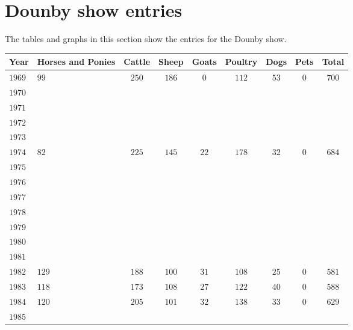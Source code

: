 \section*{Dounby show entries}
The tables and graphs in this section show the entries for the Dounby show.

\begin{longtable}{|l|p{1.1cm}ccccccc|}
\hline
    \textbf{Year} &
    \textbf{Horses and Ponies} &
    \textbf{Cattle} &
    \textbf{Sheep} &
    \textbf{Goats} &
    \textbf{Poultry} &
    \textbf{Dogs} &
    \textbf{Pets} &
    \textbf{Total}    
    \\
\hline
\endhead
\hline
\endfoot
    $1969$  & $99$  & $250$ & $186$ & $0$   & $112$ & $53$  & $0$   & $700$ \\
    $1970$  &       &       &       &       &       &       &       &       \\
    $1971$  &       &       &       &       &       &       &       &       \\
    $1972$  &       &       &       &       &       &       &       &       \\
    $1973$  &       &       &       &       &       &       &       &       \\
    $1974$  & $82$  & $225$ & $145$ & $22$  & $178$ & $32$  & $0$   & $684$ \\
    $1975$  &       &       &       &       &       &       &       &       \\
    $1976$  &       &       &       &       &       &       &       &       \\
    $1977$  &       &       &       &       &       &       &       &       \\
    $1978$  &       &       &       &       &       &       &       &       \\
    $1979$  &       &       &       &       &       &       &       &       \\
    $1980$  &       &       &       &       &       &       &       &       \\
    $1981$  &       &       &       &       &       &       &       &       \\
    $1982$  & $129$ & $188$ & $100$ & $31$  & $108$ & $25$  & $0$   & $581$ \\
    $1983$  & $118$ & $173$ & $108$ & $27$  & $122$ & $40$  & $0$   & $588$ \\
    $1984$  & $120$ & $205$ & $101$ & $32$  & $138$ & $33$  & $0$   & $629$ \\
    $1985$  &       &       &       &       &       &       &       &       \\

\end{longtable}
